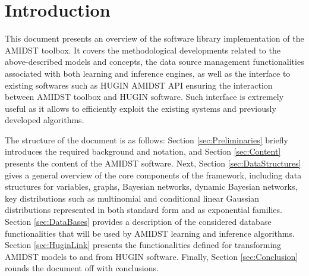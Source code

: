 \section{Introduction}

This document presents an overview of the software library implementation of the AMIDST toolbox. It covers the methodological developments related to the above-described models and concepts, the data source management functionalities associated with both learning and inference engines, as well as the interface to existing softwares such as HUGIN AMIDST API ensuring the interaction between AMIDST toolbox and HUGIN software. Such interface is extremely useful as it allows to efficiently exploit the existing systems and previously developed algorithms.

The structure of the document is as follows: Section \ref{sec:Preliminaries} briefly introduces the required background and notation, and Section \ref{sec:Content} presents the content of the AMIDST software. Next, Section \ref{sec:DataStructures} gives a general overview of the core components of the framework, including data structures for variables, graphs, Bayesian networks, dynamic Bayesian networks, key distributions such as multinomial and conditional linear Gaussian distributions represented in both standard form and as exponential families. Section \ref{sec:DataBases} provides a description of the considered database functionalities that will be used by AMIDST learning and inference algorithms. Section \ref{sec:HuginLink} presents the functionalities defined for transforming AMIDST models to and from HUGIN software. Finally, Section \ref{sec:Conclusion} rounds the document off with conclusions.